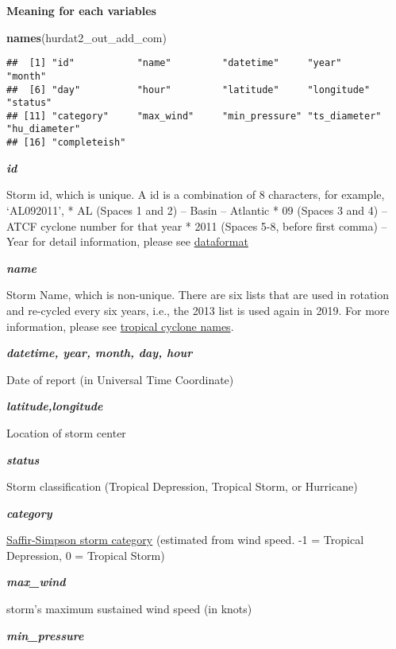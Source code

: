 \documentclass[]{book}
\newenvironment{Shaded}{\begin{snugshade}}{\end{snugshade}}
\newcommand{\KeywordTok}[1]{\textcolor[rgb]{0.13,0.29,0.53}{\textbf{#1}}}
\newcommand{\NormalTok}[1]{#1}
\begin{document}
\textbf{Meaning for each variables}

\begin{Shaded}
\begin{Highlighting}[]
\KeywordTok{names}\NormalTok{(hurdat2_out_add_com)}
\end{Highlighting}
\end{Shaded}

\begin{verbatim}
##  [1] "id"           "name"         "datetime"     "year"         "month"       
##  [6] "day"          "hour"         "latitude"     "longitude"    "status"      
## [11] "category"     "max_wind"     "min_pressure" "ts_diameter"  "hu_diameter" 
## [16] "completeish"
\end{verbatim}

\textbf{\emph{id}}

Storm id, which is unique. A id is a combination of 8 characters, for example, `AL092011',
* AL (Spaces 1 and 2) -- Basin -- Atlantic
* 09 (Spaces 3 and 4) -- ATCF cyclone number for that year
* 2011 (Spaces 5-8, before first comma) -- Year
for detail information, please see \href{https://www.nhc.noaa.gov/data/hurdat/hurdat2-format-atlantic.pdf}{dataformat}

\textbf{\emph{name}}

Storm Name, which is non-unique. There are six lists that are used in rotation and re-cycled every six years, i.e., the 2013 list is used again in 2019. For more information, please see \href{https://www.nhc.noaa.gov/aboutnames.shtml}{tropical cyclone names}.

\textbf{\emph{datetime, year, month, day, hour}}

Date of report (in Universal Time Coordinate)

\textbf{\emph{latitude,longitude}}

Location of storm center

\textbf{\emph{status}}

Storm classification (Tropical Depression, Tropical Storm, or Hurricane)

\textbf{\emph{category}}

\href{https://www.nhc.noaa.gov/aboutsshws.php}{Saffir-Simpson storm category} (estimated from wind speed. -1 = Tropical Depression, 0 = Tropical Storm)

\textbf{\emph{max\_wind}}

storm's maximum sustained wind speed (in knots)

\textbf{\emph{min\_pressure}}
\end{document}
